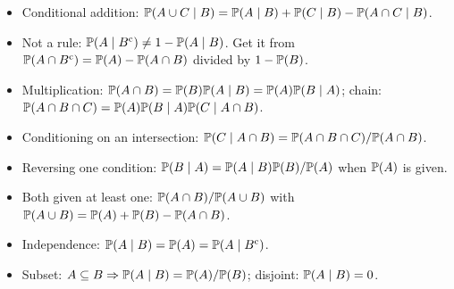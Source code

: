 \begin{itemize}[nosep]
\item Conditional addition: $\mathbb{P}(A \cup C \mid B) = \mathbb{P}(A \mid B) + \mathbb{P}(C \mid B) - \mathbb{P}(A \cap C \mid B)$.
\item Not a rule: $\mathbb{P}(A \mid B^{\mathrm{c}}) \ne 1 - \mathbb{P}(A \mid B)$. Get it from
$\mathbb{P}(A \cap B^{\mathrm{c}}) = \mathbb{P}(A) - \mathbb{P}(A \cap B)$ divided by $1 - \mathbb{P}(B)$.
\item Multiplication: $\mathbb{P}(A \cap B) = \mathbb{P}(B)\mathbb{P}(A \mid B) = \mathbb{P}(A)\mathbb{P}(B \mid A)$;
chain: $\mathbb{P}(A \cap B \cap C) = \mathbb{P}(A)\mathbb{P}(B \mid A)\mathbb{P}(C \mid A \cap B)$.
\item Conditioning on an intersection: $\mathbb{P}(C \mid A \cap B) = \mathbb{P}(A \cap B \cap C)/\mathbb{P}(A \cap B)$.
\item Reversing one condition: $\mathbb{P}(B \mid A) = \mathbb{P}(A \mid B)\mathbb{P}(B)/\mathbb{P}(A)$ when $\mathbb{P}(A)$ is given.
\item Both given at least one: $\mathbb{P}(A \cap B)/\mathbb{P}(A \cup B)$ with
$\mathbb{P}(A \cup B) = \mathbb{P}(A) + \mathbb{P}(B) - \mathbb{P}(A \cap B)$.
\item Independence: $\mathbb{P}(A \mid B) = \mathbb{P}(A) = \mathbb{P}(A \mid B^{\mathrm{c}})$.
\item Subset: $A \subseteq B \Rightarrow \mathbb{P}(A \mid B) = \mathbb{P}(A)/\mathbb{P}(B)$;
disjoint: $\mathbb{P}(A \mid B) = 0$.
\end{itemize}
